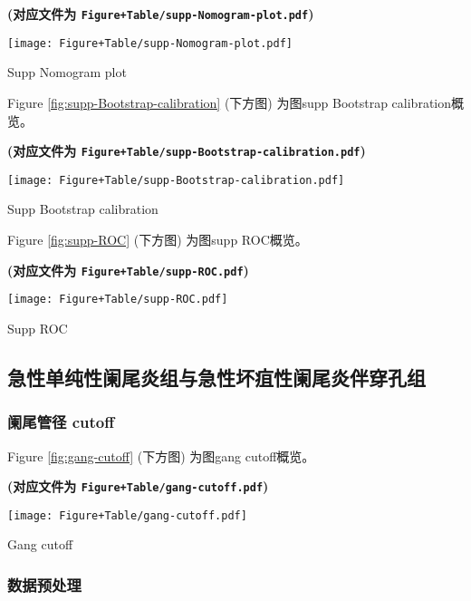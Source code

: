 \documentclass[
]{article}
\begin{document}
\textbf{(对应文件为 \texttt{Figure+Table/supp-Nomogram-plot.pdf})}

\def\@captype{figure}
\begin{center}
\texttt{[image: Figure+Table/supp-Nomogram-plot.pdf]}
\caption{Supp Nomogram plot}\label{fig:supp-Nomogram-plot}
\end{center}

Figure \ref{fig:supp-Bootstrap-calibration} (下方图) 为图supp Bootstrap calibration概览。

\textbf{(对应文件为 \texttt{Figure+Table/supp-Bootstrap-calibration.pdf})}

\def\@captype{figure}
\begin{center}
\texttt{[image: Figure+Table/supp-Bootstrap-calibration.pdf]}
\caption{Supp Bootstrap calibration}\label{fig:supp-Bootstrap-calibration}
\end{center}

Figure \ref{fig:supp-ROC} (下方图) 为图supp ROC概览。

\textbf{(对应文件为 \texttt{Figure+Table/supp-ROC.pdf})}

\def\@captype{figure}
\begin{center}
\texttt{[image: Figure+Table/supp-ROC.pdf]}
\caption{Supp ROC}\label{fig:supp-ROC}
\end{center}

\hypertarget{gang}{%
\subsection{急性单纯性阑尾炎组与急性坏疽性阑尾炎伴穿孔组}\label{gang}}

\hypertarget{ux9611ux5c3eux7ba1ux5f84-cutoff-1}{%
\subsubsection{阑尾管径 cutoff}\label{ux9611ux5c3eux7ba1ux5f84-cutoff-1}}

Figure \ref{fig:gang-cutoff} (下方图) 为图gang cutoff概览。

\textbf{(对应文件为 \texttt{Figure+Table/gang-cutoff.pdf})}

\def\@captype{figure}
\begin{center}
\texttt{[image: Figure+Table/gang-cutoff.pdf]}
\caption{Gang cutoff}\label{fig:gang-cutoff}
\end{center}

\hypertarget{ux6570ux636eux9884ux5904ux7406-1}{%
\subsubsection{数据预处理}\label{ux6570ux636eux9884ux5904ux7406-1}}
\end{document}
